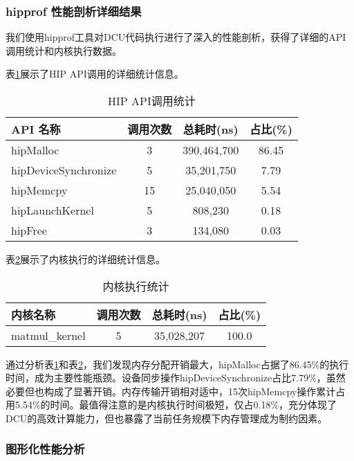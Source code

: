 \documentclass[12pt,a4paper]{article}
\begin{document}
\subsubsection{hipprof 性能剖析详细结果}

我们使用hipprof工具对DCU代码执行进行了深入的性能剖析，获得了详细的API调用统计和内核执行数据。

表\ref{tab:hip_api_stats}展示了HIP API调用的详细统计信息。

\begin{table}[H]
\centering
\caption{HIP API调用统计}
\label{tab:hip_api_stats}
\begin{tabular}{lccc}
\toprule
API 名称 & 调用次数 & 总耗时(ns) & 占比(\%) \\
\midrule
hipMalloc & 3 & 390,464,700 & 86.45 \\
hipDeviceSynchronize & 5 & 35,201,750 & 7.79 \\
hipMemcpy & 15 & 25,040,050 & 5.54 \\
hipLaunchKernel & 5 & 808,230 & 0.18 \\
hipFree & 3 & 134,080 & 0.03 \\
\bottomrule
\end{tabular}
\end{table}

表\ref{tab:kernel_execution}展示了内核执行的详细统计信息。

\begin{table}[H]
\centering
\caption{内核执行统计}
\label{tab:kernel_execution}
\begin{tabular}{lccc}
\toprule
内核名称 & 调用次数 & 总耗时(ns) & 占比(\%) \\
\midrule
matmul\_kernel & 5 & 35,028,207 & 100.0 \\
\bottomrule
\end{tabular}
\end{table}

通过分析表\ref{tab:hip_api_stats}和表\ref{tab:kernel_execution}，我们发现内存分配开销最大，hipMalloc占据了86.45\%的执行时间，成为主要性能瓶颈。设备同步操作hipDeviceSynchronize占比7.79\%，虽然必要但也构成了显著开销。内存传输开销相对适中，15次hipMemcpy操作累计占用5.54\%的时间。最值得注意的是内核执行时间极短，仅占0.18\%，充分体现了DCU的高效计算能力，但也暴露了当前任务规模下内存管理成为制约因素。

\subsubsection{图形化性能分析}
\end{document}
